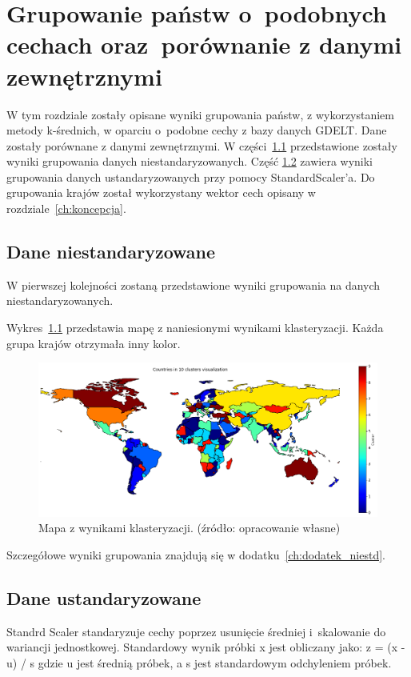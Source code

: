 \documentclass[11pt]{report}
\begin{document}
    \chapter[Grupowanie państw]{Grupowanie państw o~podobnych cechach oraz~porównanie z danymi zewnętrznymi}\label{ch:grupowanie-państw-opodobnych-cechach-orazporównanie-z-danymi-zewnętrznymi}

    W tym rozdziale zostały opisane wyniki grupowania państw, z wykorzystaniem metody k-średnich, w oparciu o~podobne cechy z bazy danych GDELT.
    Dane zostały porównane z danymi zewnętrznymi.
    W części~\ref{sec:dane-niestandaryzowane} przedstawione zostały wyniki grupowania danych niestandaryzowanych.
    Część \ref{sec:dane-ustandaryzowane} zawiera wyniki grupowania danych ustandaryzowanych przy pomocy StandardScaler'a.
    Do grupowania krajów został wykorzystany wektor cech opisany w rozdziale~\ref{ch:koncepcja}.


    \section{Dane niestandaryzowane}\label{sec:dane-niestandaryzowane}
    W pierwszej kolejności zostaną przedstawione wyniki grupowania na danych niestandaryzowanych.

    Wykres~\ref{fig:clust10} przedstawia mapę z naniesionymi wynikami klasteryzacji.
    Każda grupa krajów otrzymała inny kolor.

    \begin{figure}[!htp]
        \centering
        \includegraphics[width=\linewidth]{fig/CLUST/10clusterMap.png}
        \caption{Mapa z wynikami klasteryzacji. (źródło: opracowanie własne)}
        \label{fig:clust10}
    \end{figure}

    Szczegółowe wyniki grupowania znajdują się w dodatku~\ref{ch:dodatek_niestd}.


    \section{Dane ustandaryzowane}\label{sec:dane-ustandaryzowane}
    Standrd Scaler standaryzuje cechy poprzez usunięcie średniej i~skalowanie do wariancji jednostkowej.
    Standardowy wynik próbki x jest obliczany jako:
    z = (x - u) / s
    gdzie u jest średnią próbek, a s jest standardowym odchyleniem próbek.
\end{document}
